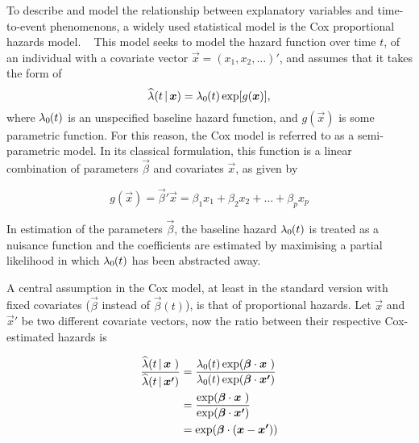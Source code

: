 To describe and model the relationship between explanatory variables
and time-to-event phenomenons, a widely used statistical model is 
the Cox proportional hazards model. 
~\autocite{coxRegression1972}
This model seeks to model the hazard function over time \(t\),
of an individual with a covariate vector \(\vec{x} = (x_1, x_2, \dots)'\),
and assumes that it takes the form of
%
\begin{equation}
    \label{eq:cox}
    \widehat{\lambda} (t \,|\, \vec{x}) = \hzt \exp [g(\vec{x})],
\end{equation}
%
where \(\lambda_0\mspace{-1mu}(t)\)
is an unspecified baseline hazard function,
and \(g(\vec{x})\) is some parametric function.
For this reason, the Cox model 
is referred to as a semi-parametric model.
In its classical formulation, 
this function is a linear combination of parameters 
\(\vec{\beta}\) and covariates \(\vec{x}\),
as given by

\begin{equation}
    g(\vec{x}) 
    = \vec{\beta}' \vec{x} 
    = \beta_1 x_1 + \beta_2 x_2 + \ldots + \beta_p x_p
\end{equation}

In estimation of the parameters \(\vec{\beta}\),
the baseline hazard \(\lambda_0\mspace{-1mu}(t)\) is treated as a nuisance function
and the coefficients are estimated by
maximising a partial likelihood
in which \(\lambda_0\mspace{-1mu}(t)\) has been abstracted away.
~\autocite{kalbfleischStatistical2002}

A central assumption in the Cox model, 
at least in the standard version with fixed covariates
(\(\vec{\beta}\) instead of \(\vec{\beta}(t)\)),
is that of proportional hazards.
Let \(\vec{x}\) and \(\vec{x}'\) be two different 
covariate vectors, now the ratio between their
respective Cox-estimated hazards is

\begin{equation}
    \label{eq:hazard-ratio}
    \begin{aligned}
    \frac%
        {\widehat{\lambda}(t \,|\, \vec{x} \hfill)}%
        {\widehat{\lambda}(t \,|\, \vec{x'})}
    &=
    \frac%
        {\hzt \exp (\vec{\beta}\cdot\vec{x}\hfill)}%
        {\hzt \exp (\vec{\beta}\cdot\vec{x'})} \\
    &=
    \frac%
        {\exp (\vec{\beta}\cdot\vec{x}\hfill)}%
        {\exp (\vec{\beta}\cdot\vec{x'})} \\
    &= \exp (\vec{\beta} \cdot (\vec{x} - \vec{x'}))
    \end{aligned}
\end{equation}

